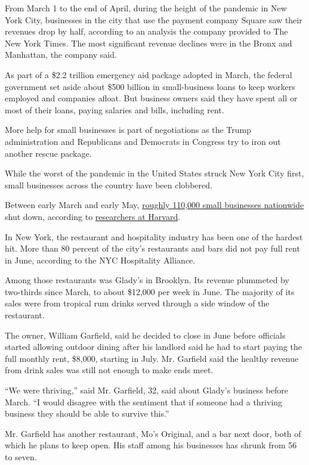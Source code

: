 From March 1 to the end of April, during the height of the pandemic in
New York City, businesses in the city that use the payment company
Square saw their revenues drop by half, according to an analysis the
company provided to The New York Times. The most significant revenue
declines were in the Bronx and Manhattan, the company said.

As part of a \$2.2 trillion emergency aid package adopted in March, the
federal government set aside about \$500 billion in small-business loans
to keep workers employed and companies afloat. But business owners said
they have spent all or most of their loans, paying salaries and bills,
including rent.

More help for small businesses is part of negotiations as the Trump
administration and Republicans and Democrats in Congress try to iron out
another rescue package.

While the worst of the pandemic in the United States struck New York
City first, small businesses across the country have been clobbered.

Between early March and early May,
\href{https://www.nytimes3xbfgragh.onion/2020/07/13/business/small-businesses-coronavirus.html}{roughly
110,000 small businesses nationwide} shut down, according to
\href{https://www.nber.org/papers/w26989.pdf}{researchers at Harvard}.

In New York, the restaurant and hospitality industry has been one of the
hardest hit. More than 80 percent of the city's restaurants and bars did
not pay full rent in June, according to the NYC Hospitality Alliance.

Among those restaurants was Glady's in Brooklyn. Its revenue plummeted
by two-thirds since March, to about \$12,000 per week in June. The
majority of its sales were from tropical rum drinks served through a
side window of the restaurant.

The owner, William Garfield, said he decided to close in June before
officials started allowing outdoor dining after his landlord said he had
to start paying the full monthly rent, \$8,000, starting in July. Mr.
Garfield said the healthy revenue from drink sales was still not enough
to make ends meet.

``We were thriving,'' said Mr. Garfield, 32, said about Glady's business
before March. ``I would disagree with the sentiment that if someone had
a thriving business they should be able to survive this.''

Mr. Garfield has another restaurant, Mo's Original, and a bar next door,
both of which he plans to keep open. His staff among his businesses has
shrunk from 56 to seven.

